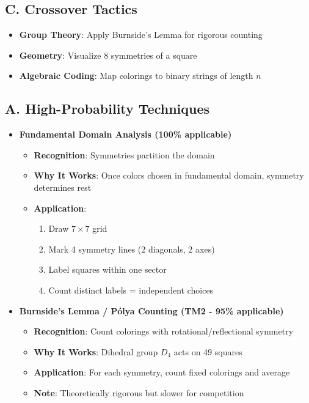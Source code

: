 \documentclass[]{article}
\begin{document}
\begin{tacticalbox}
\subsection*{C. Crossover Tactics}
\begin{itemize}[leftmargin=*]
    \item \textbf{Group Theory}: Apply Burnside's Lemma for rigorous counting
    \item \textbf{Geometry}: Visualize 8 symmetries of a square
    \item \textbf{Algebraic Coding}: Map colorings to binary strings of length $n$
\end{itemize}
\end{tacticalbox}

\begin{techniquesbox}
\subsection*{A. High-Probability Techniques}

\begin{itemize}[leftmargin=*]
    \item \textbf{Fundamental Domain Analysis (100\% applicable)}
    \begin{itemize}
        \item \textbf{Recognition}: Symmetries partition the domain
        \item \textbf{Why It Works}: Once colors chosen in fundamental domain, symmetry determines rest
        \item \textbf{Application}:
        \begin{enumerate}
            \item Draw $7 \times 7$ grid
            \item Mark 4 symmetry lines (2 diagonals, 2 axes)
            \item Label squares within one sector
            \item Count distinct labels = independent choices
        \end{enumerate}
    \end{itemize}
    
    \item \textbf{Burnside's Lemma / P\'olya Counting (TM2 - 95\% applicable)}
    \begin{itemize}
        \item \textbf{Recognition}: Count colorings with rotational/reflectional symmetry
        \item \textbf{Why It Works}: Dihedral group $D_4$ acts on 49 squares
        \item \textbf{Application}: For each symmetry, count fixed colorings and average
        \item \textbf{Note}: Theoretically rigorous but slower for competition
    \end{itemize}
\end{itemize}


\end{techniquesbox}
\end{document}
